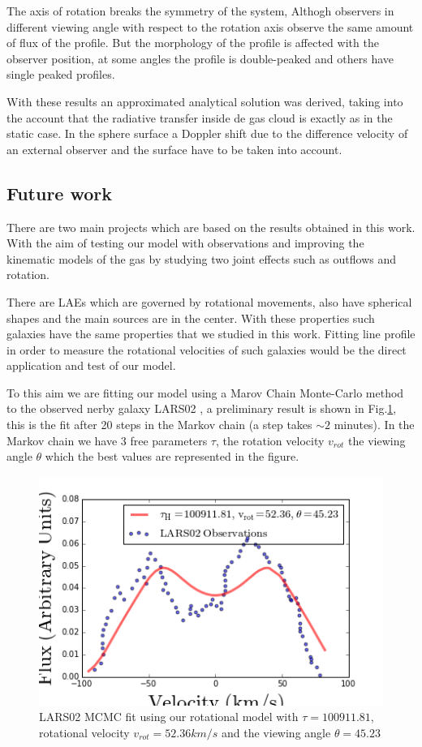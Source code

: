 The axis of rotation breaks the symmetry of the system, Althogh 
observers in different viewing angle with respect to the rotation axis
observe the same amount of flux of the \ly profile. But the morphology
of the profile is affected with the observer position, at some angles
the profile is double-peaked and others have single peaked profiles. 
 
 
With these results an approximated analytical solution was derived, 
taking into the account that the radiative transfer inside de gas
cloud is exactly as in the static case. In the sphere surface
a Doppler shift due to the difference velocity of an external 
observer and the surface have to be taken into account.  


\subsection{Future work}

There are two main projects which are based on the results obtained in 
this work. With the aim of testing our model with observations and
improving the kinematic models of the gas by studying two joint effects
such as outflows and rotation.  

There are LAEs which are governed by rotational movements, also 
have spherical shapes and the main \ly sources are in the center. 
With these properties such galaxies have the same properties 
that we studied in this work.  
Fitting \ly line profile in order  to measure the rotational 
velocities of such galaxies would be the direct application 
and test of our model. 

To this aim we are fitting our model using a Marov Chain Monte-Carlo 
method to the observed nerby galaxy LARS02 \citep{LARS}, a preliminary 
result is shown in Fig.\ref{fig:LARS}, this is the fit after 20 steps
in the Markov chain (a step takes $\sim 2$ minutes). In the Markov
chain we have 3 free parameters $\tau$, the rotation velocity $v_{rot}$  
the viewing angle $\theta$ which the best
values are represented in the figure.

\begin{figure}%
\begin{center}
\includegraphics[scale=0.6]{../Figures/LARS02_fit.png}
\end{center}\caption{LARS02 MCMC fit using our rotational model with $\tau=100911.81$, rotational velocity $v_{rot}=52.36km/s$ and the viewing angle $\theta =45.23$ \label{fig:LARS}
} 
\end{figure}

